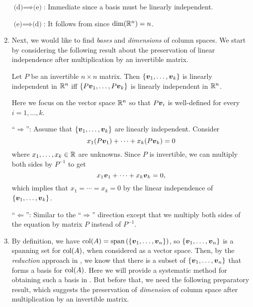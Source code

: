 \begin{enumerate}
\begin{pf}
\underline{\(\text{(d)}\implies\text{(e)}\)}: Immediate since a basis must be
linearly independent.

\underline{\(\text{(e)}\implies\text{(d)}\)}: It follows from
 since \(\dim(\mathbb{R}^n)=n\).
\end{pf}
\item Next, we would like to find \emph{bases} and \emph{dimensions} of column
spaces. We start by considering the following result about the preservation of
linear independence after multiplication by an invertible matrix.

\begin{theorem}
\label{thm:mult-inv-matx-preserv-li}
Let \(P\) be an invertible \(n\times n\) matrix. Then
\(\{\vb*{v}_1,\dotsc,\vb*{v}_k\}\) is linearly independent in \(\mathbb{R}^n\) iff
\(\{P\vb*{v}_1,\dotsc,P\vb*{v}_k\}\) is linearly independent in \(\mathbb{R}^n\).
\end{theorem}
\begin{note}
Here we focus on the vector space \(\mathbb{R}^n\) so that \(P\vb*{v}_i\) is
well-defined for every \(i=1,\dotsc,k\).
\end{note}

\begin{pf}
``\(\Rightarrow\)'': Assume that \(\{\vb*{v}_1,\dotsc,\vb*{v}_k\}\) are
linearly independent. Consider
\[
x_1(P\vb*{v}_1)+\dotsb+x_k(P\vb*{v}_k)=0
\]
where \(x_1,\dotsc,x_k\in\mathbb{R}\) are unknowns. Since \(P\) is invertible,
we can multiply both sides by \(P^{-1}\) to get
\[
x_1\vb*{v}_1+\dotsb+x_k\vb*{v}_k=0,
\]
which implies that \(x_1=\dotsb=x_k=0\) by the linear independence of
\(\{\vb*{v}_1,\dotsc,\vb*{v}_k\}\).

``\(\Leftarrow\)'': Similar to the ``\(\Rightarrow\)'' direction except that we
multiply both sides of the equation by matrix \(P\) instead of \(P^{-1}\).
\end{pf}

\item By definition, we have
\(\operatorname{col}(A)=\operatorname{span}\qty(\{\vb*{v}_1,\dotsc,\vb*{v}_n\})\), so
\(\{\vb*{v}_1,\dotsc,\vb*{v}_n\}\) is a spanning set for \(\operatorname{col}(A)\), when
considered as a vector space. Then, by the \emph{reduction} approach in
, we know that there is a subset of
\(\{\vb*{v}_1,\dotsc,\vb*{v}_n\}\) that forms a basis for \(\operatorname{col}(A)\). Here
we will provide a systematic method for obtaining such a basis in
. But before that, we need the following
preparatory result, which suggests the preservation of \emph{dimension} of
column space after multiplication by an invertible matrix.


\end{enumerate}
